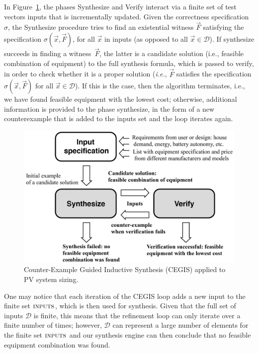 \documentclass[10pt,conference]{IEEEtran}
\begin{document}
In Figure~\ref{Counter-Example-Guided-Inductive-Synthesis}, the phases {\sc Synthesize} and {\sc Verify} interact via a finite set of test vectors {\sc inputs} that is incrementally updated. Given the correctness specification $\sigma$, the {\sc Synthesize} procedure tries to find an existential witness $\vec{F}$ satisfying the specification $\sigma(\vec{x}, \vec{F})$, for all $\vec{x}$ in {\sc inputs} (as opposed to all $\vec{x} \in \mathcal{D}$). If {\sc synthesize} succeeds in finding a witness~$\vec{F}$, the latter is a candidate solution (i.e., feasible combination of equipment) to the full synthesis formula, which is passed to {\sc verify}, in order to check whether it is a proper solution ({\it i.e.}, $\vec{F}$ satisfies the specification $\sigma(\vec{x}, \vec{F})$ for all $\vec{x}\in\mathcal{D}$). If this is the case, then the algorithm terminates, i.e., we have found feasible equipment with the lowest cost; otherwise, additional information is provided to the phase {\sc synthesize}, in the form of a new counterexample that is added to the {\sc inputs} set and the loop iterates again. 
%
\begin{figure}[h]
	\centering
	\includegraphics[width=0.85\columnwidth]{fig2_rev.jpg}
	\caption{Counter-Example Guided Inductive Synthesis (CEGIS) applied to PV system sizing.}
	\label{Counter-Example-Guided-Inductive-Synthesis}
\end{figure}
%
One may notice that each iteration of the CEGIS loop adds a new input to the finite set $\text{\sc inputs}$, which is then used for synthesis.  Given that the full set of inputs $\mathcal{D}$ is finite, this means that the refinement loop can only iterate over a finite number of times; however, $\mathcal{D}$ can represent a large number of elements for the finite set $\text{\sc inputs}$ and our synthesis engine can then conclude that no feasible equipment combination was found. 
\end{document}
